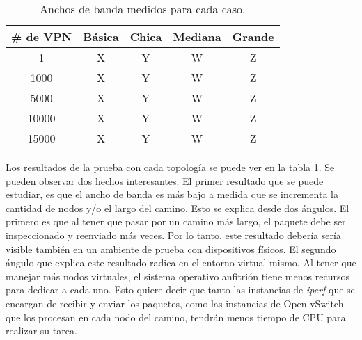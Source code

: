 \begin{table}[ht]
	\caption{Anchos de banda medidos para cada caso.}
	\centering 
	\begin{tabular}{c c c c c}
		\hline\hline
		\# de VPN & Básica & Chica & Mediana  & Grande \\ [0.5ex]
		\hline
		1 & X & Y & W & Z \\
		1000 & X & Y & W & Z  \\
		5000 & X & Y & W & Z \\
		10000 & X & Y & W & Z \\
		15000 & X & Y & W & Z \\ [1ex]
		\hline
	\end{tabular}
	\label{table:escala_de_servicios}
\end{table}

Los resultados de la prueba con cada topología se puede ver en la tabla \ref{table:escala_de_servicios}. Se pueden observar dos hechos interesantes. El primer resultado que se puede estudiar, es que el ancho de banda es más bajo a medida que se incrementa la cantidad de nodos y/o el largo del camino. Esto se explica desde dos ángulos. El primero es que al tener que pasar por un camino más largo, el paquete debe ser inspeccionado y reenviado más veces. Por lo tanto, este resultado debería sería visible también en un ambiente de prueba con dispositivos físicos. El segundo ángulo que explica este resultado radica en el entorno virtual mismo. Al tener que manejar más nodos virtuales, el sistema operativo anfitrión tiene menos recursos para dedicar a cada uno. Esto quiere decir que tanto las instancias de \textit{iperf} que se encargan de recibir y enviar los paquetes, como las instancias de Open vSwitch que los procesan en cada nodo del camino, tendrán menos tiempo de CPU para realizar su tarea. \\

